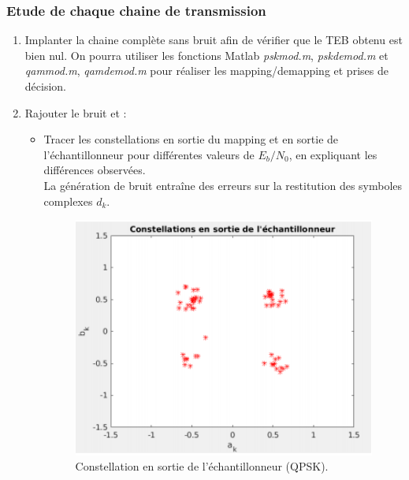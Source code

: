 \documentclass[frenchb]{article}
\begin{document}
\subsubsection{Etude de chaque chaine de transmission}
\begin{enumerate}
    \item Implanter la chaine complète sans bruit afin de vérifier que le TEB obtenu est bien nul. On pourra utiliser les fonctions Matlab \emph{pskmod.m}, \emph{pskdemod.m }et \emph{qammod.m}, \emph{qamdemod.m} pour réaliser les mapping/demapping et prises de décision.
    \item Rajouter le bruit et :
        \begin{itemize}
            \item Tracer les constellations en sortie du mapping et en sortie de l'échantillonneur pour différentes valeurs de $E_b/N_0$, en expliquant les différences observées. \\
            
            La génération de bruit entraîne des erreurs sur la restitution des symboles complexes $d_k$. 
     \begin{figure}[ht!]
    \centering
    \includegraphics[width=12cm]{C3QPSKconstech.png}
    \caption{Constellation en sortie de l'échantillonneur (QPSK).}
    \label{C35}
 \end{figure}
 

\end{itemize}
\end{enumerate}
\end{document}
